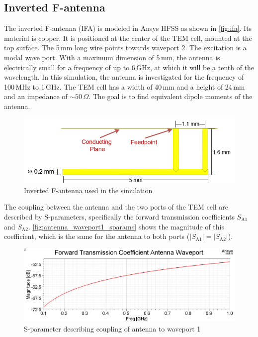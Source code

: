 


\subsection{Inverted F-antenna}\label{sec:ifa_sim}




The inverted F-antenna (IFA) is modeled in Ansys HFSS as shown in \autoref{fig:ifa}. Its material is copper. It is positioned at the center of the TEM cell, mounted at the top surface. The 5\,mm long wire points towards waveport 2. The excitation is a modal wave port. With a maximum dimension of 5\,mm, the antenna is electrically small for a frequency of up to 6\,GHz, at which it will be a tenth of the wavelength. In this simulation, the antenna is investigated for the frequency of 100\,MHz to 1\,GHz. The TEM cell has a width of 40\,mm and a height of 24\,mm and an impedance of $\sim50\,\Omega$. The goal is to find equivalent dipole moments of the antenna. 


\begin{figure}[h]
    \centering
    \includegraphics[width=0.75\linewidth]{Documentation//content//30_simulations//img/inverted_f_antenna.png}
    \caption{Inverted F-antenna used in the simulation}
    \label{fig:ifa}
\end{figure}

The coupling between the antenna and the two ports of the TEM cell are described by S-parameters, specifically the forward transmission coefficients $S_{\mathrm{A1}}$ and $S_{\mathrm{A2}}$. \autoref{fig:antenna_waveport1_sparams} shows the magnitude of this coefficient, which is the same for the antenna to both ports ($|S_{\mathrm{A1}}|=|S_{\mathrm{A2}}|$). 
 

\begin{figure}[h]
    \centering
    \includegraphics[width=1\linewidth]{Documentation//content//30_simulations//img/antenna_waveport1_sparams.png}
    \caption{S-parameter describing coupling of antenna to waveport 1}
    \label{fig:antenna_waveport1_sparams}
\end{figure}

